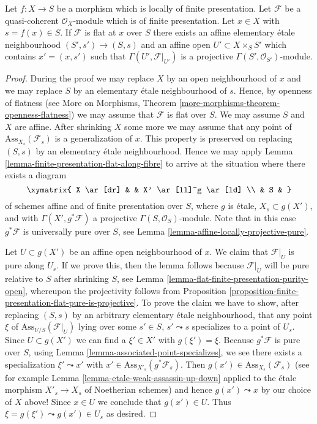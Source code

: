 \begin{lemma}
\label{lemma-flat-finite-presentation-affine-neighbourhood-projective}
Let $f : X \to S$ be a morphism which is locally of finite presentation.
Let $\mathcal{F}$ be a quasi-coherent $\mathcal{O}_X$-module which is
of finite presentation. Let $x \in X$ with $s = f(x) \in S$.
If $\mathcal{F}$ is flat at $x$ over $S$ there exists an affine
elementary \'etale neighbourhood $(S', s') \to (S, s)$ and
an affine open $U' \subset X \times_S S'$ which contains $x' = (x, s')$
such that $\Gamma(U', \mathcal{F}|_{U'})$ is a projective
$\Gamma(S', \mathcal{O}_{S'})$-module.
\end{lemma}

\begin{proof}
During the proof we may replace $X$ by an open neighbourhood of $x$
and we may replace $S$ by an elementary \'etale neighbourhood of $s$.
Hence, by openness of flatness (see
More on Morphisms, Theorem \ref{more-morphisms-theorem-openness-flatness})
we may assume that $\mathcal{F}$ is flat over $S$.
We may assume $S$ and $X$ are affine.
After shrinking $X$ some more we may assume that any
point of $\text{Ass}_{X_s}(\mathcal{F}_s)$ is a generalization of $x$.
This property is preserved on replacing $(S, s)$ by an elementary
\'etale neighbourhood. Hence we may apply
Lemma \ref{lemma-finite-presentation-flat-along-fibre}
to arrive at the situation where there exists a diagram
$$
\xymatrix{
X \ar[dr] & & X' \ar[ll]^g \ar[ld] \\
& S &
}
$$
of schemes affine and of finite presentation over $S$,
where $g$ is \'etale, $X_s \subset g(X')$, and with
$\Gamma(X', g^*\mathcal{F})$ a projective $\Gamma(S, \mathcal{O}_S)$-module.
Note that in this case $g^*\mathcal{F}$ is universally pure over $S$, see
Lemma \ref{lemma-affine-locally-projective-pure}.

\medskip\noindent
Let $U \subset g(X')$ be an affine open neighbourhood of $x$.
We claim that $\mathcal{F}|_U$ is pure along $U_s$. If we prove this, then
the lemma follows because $\mathcal{F}|_U$ will be pure relative to $S$
after shrinking $S$, see
Lemma \ref{lemma-flat-finite-presentation-purity-open},
whereupon the projectivity follows from
Proposition \ref{proposition-finite-presentation-flat-pure-is-projective}.
To prove the claim we have to show, after replacing $(S, s)$
by an arbitrary elementary \'etale neighbourhood, that any point $\xi$ of
$\text{Ass}_{U/S}(\mathcal{F}|_U)$ lying over some
$s' \in S$, $s' \leadsto s$ specializes to a point of $U_s$.
Since $U \subset g(X')$ we can find a $\xi' \in X'$ with
$g(\xi') = \xi$. Because $g^*\mathcal{F}$ is pure over $S$, using
Lemma \ref{lemma-associated-point-specializes},
we see there exists a specialization $\xi' \leadsto x'$ with
$x' \in \text{Ass}_{X'_s}(g^*\mathcal{F}_s)$. Then
$g(x') \in \text{Ass}_{X_s}(\mathcal{F}_s)$ (see for example
Lemma \ref{lemma-etale-weak-assassin-up-down}
applied to the \'etale morphism $X'_s \to X_s$ of Noetherian schemes)
and hence $g(x') \leadsto x$ by our choice of $X$ above! Since
$x \in U$ we conclude that $g(x') \in U$. Thus
$\xi = g(\xi') \leadsto g(x') \in U_s$ as desired.
\end{proof}

